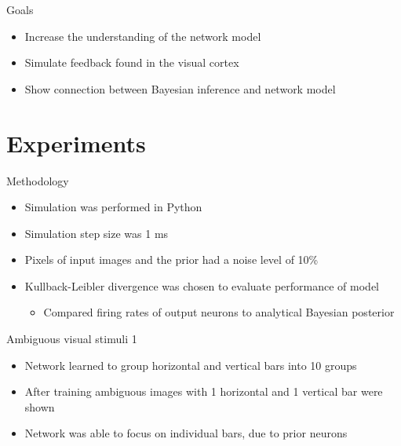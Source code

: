 \documentclass[aspectratio=169]{beamer}
\begin{document}
\begin{frame}{Goals}


  \begin{itemize}

    \item Increase the understanding of the network model
    \item Simulate feedback found in the visual cortex
    \item Show connection between Bayesian inference and network model
  \end{itemize}
\end{frame}


\section{Experiments}

\begin{frame}{Methodology}
\begin{itemize}
	\item Simulation was performed in Python
	\item Simulation step size was 1 ms
	\item Pixels of input images and the prior had a noise level of 10\%
	\item Kullback-Leibler divergence was chosen to evaluate performance of model
	\begin{itemize}
	  \item Compared firing rates of output neurons to analytical Bayesian posterior
	\end{itemize}
\end{itemize}
\end{frame}

\begin{frame}{Ambiguous visual stimuli 1}
  \begin{itemize}
    \item Network learned to group horizontal and vertical bars into 10 groups
    \item After training ambiguous images with 1 horizontal and 1 vertical bar were shown
    \item Network was able to focus on individual bars, due to prior neurons
  \end{itemize}
\end{frame}
\end{document}
